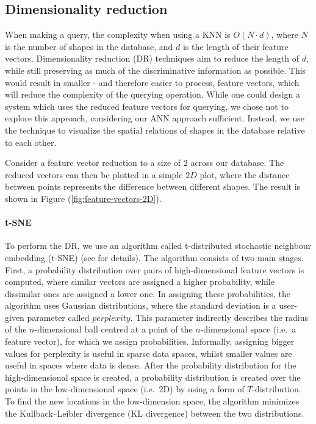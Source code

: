 \subsection{Dimensionality reduction}\label{subsec:dimensionality-reduction}
When making a query, the complexity when using a KNN is $O(N \cdot d)$, where $N$ is the number of shapes in the database, and $d$ is the length of their feature vectors.
Dimensionality reduction (DR) techniques aim to reduce the length of $d$, while still preserving as much of the discriminative information as possible.
This would result in smaller - and therefore easier to process, feature vectors, which will reduce the complexity of the querying operation.
While one could design a system which uses the reduced feature vectors for querying, we chose not to explore this approach, considering our ANN approach sufficient.
Instead, we use the technique to visualize the spatial relations of shapes in the database relative to each other.

Consider a feature vector reduction to a size of $2$ across our database.
The reduced vectors can then be plotted in a simple $2D$ plot, where the distance between points represents the difference between different shapes.
The result is shown in Figure (\ref{fig:feature-vectors-2D}).

\paragraph{t-SNE}
To perform the DR, we use an algorithm called t-distributed stochastic neighbour embedding (t-SNE) (see \cite{van2008visualizing} for details).
The algorithm consists of two main stages.
First, a probability distribution over pairs of high-dimensional feature vectors is computed, where similar vectors are assigned a higher probability, while dissimilar ones are assigned a lower one.
In assigning these probabilities, the algorithm uses Gaussian distributions, where the standard deviation is a user-given parameter called $perplexity$.
This parameter indirectly describes the radius of the $n$-dimensional ball centred at a point of the $n$-dimensional space (i.e.\ a feature vector), for which we assign probabilities.
Informally, assigning bigger values for perplexity is useful in sparse data spaces, whilst smaller values are useful in spaces where data is dense.
After the probability distribution for the high-dimensional space is created, a probability distribution is created over the points in the low-dimensional space (i.e.\ 2D) by using a form of $T$-distribution.
To find the new locations in the low-dimension space, the algorithm minimizes the Kullback–Leibler divergence (KL divergence) between the two distributions.

